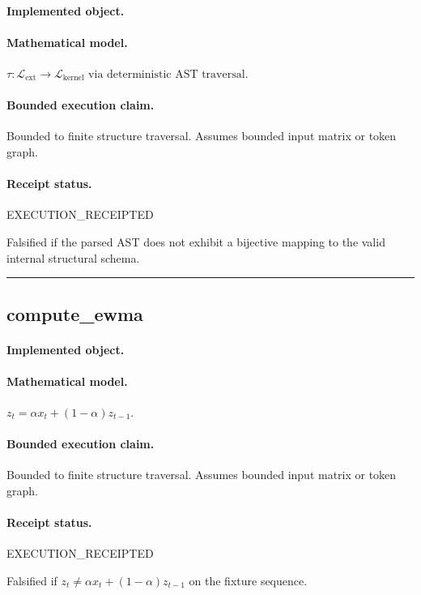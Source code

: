 \paragraph{Implemented object.} 
\paragraph{Mathematical model.} $\tau : \mathcal{L}_{\text{ext}} \to \mathcal{L}_{\text{kernel}} \text{ via deterministic AST traversal}.$
\paragraph{Bounded execution claim.} Bounded to finite structure traversal. Assumes bounded input matrix or token graph.
\paragraph{Receipt status.} EXECUTION\_RECEIPTED
\begin{falsifier}
Falsified if the parsed AST does not exhibit a bijective mapping to the valid internal structural schema.
\end{falsifier}

\vspace{1em}\hrule\vspace{1em}
\subsection{compute\_ewma}
\paragraph{Implemented object.} 
\paragraph{Mathematical model.} $z_t=\alpha x_t+(1-\alpha)z_{t-1}.$
\paragraph{Bounded execution claim.} Bounded to finite structure traversal. Assumes bounded input matrix or token graph.
\paragraph{Receipt status.} EXECUTION\_RECEIPTED
\begin{falsifier}
Falsified if $z_t \neq \alpha x_t + (1-\alpha)z_{t-1}$ on the fixture sequence.
\end{falsifier}

